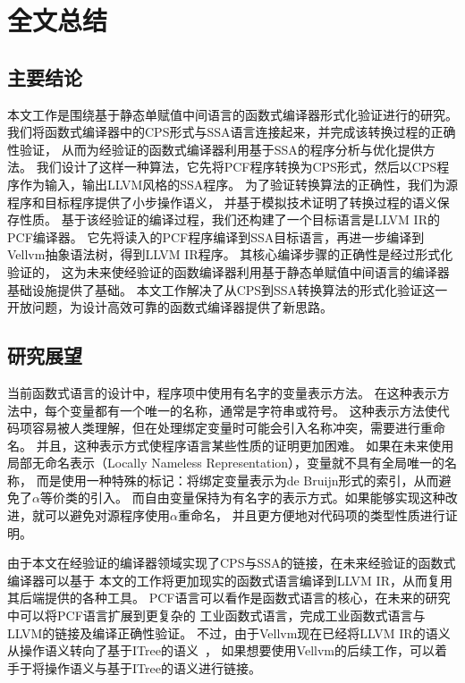 
\chapter{全文总结} \label{ch:summary}

\section{主要结论}

本文工作是围绕基于静态单赋值中间语言的函数式编译器形式化验证进行的研究。
我们将函数式编译器中的CPS形式与SSA语言连接起来，并完成该转换过程的正确性验证，
从而为经验证的函数式编译器利用基于SSA的程序分析与优化提供方法。
我们设计了这样一种算法，它先将PCF程序转换为CPS形式，然后以CPS程序作为输入，输出LLVM风格的SSA程序。
为了验证转换算法的正确性，我们为源程序和目标程序提供了小步操作语义，
并基于模拟技术证明了转换过程的语义保存性质。
基于该经验证的编译过程，我们还构建了一个目标语言是LLVM IR的PCF编译器。
它先将读入的PCF程序编译到SSA目标语言，再进一步编译到Vellvm抽象语法树，得到LLVM IR程序。
其核心编译步骤的正确性是经过形式化验证的，
这为未来使经验证的函数编译器利用基于静态单赋值中间语言的编译器基础设施提供了基础。
本文工作解决了从CPS到SSA转换算法的形式化验证这一开放问题，为设计高效可靠的函数式编译器提供了新思路。

\section{研究展望}

当前函数式语言的设计中，程序项中使用有名字的变量表示方法。
在这种表示方法中，每个变量都有一个唯一的名称，通常是字符串或符号。
这种表示方法使代码项容易被人类理解，但在处理绑定变量时可能会引入名称冲突，需要进行重命名。
并且，这种表示方式使程序语言某些性质的证明更加困难。
如果在未来使用局部无命名表示（Locally Nameless Representation），变量就不具有全局唯一的名称，
而是使用一种特殊的标记：将绑定变量表示为de Bruijn形式的索引，从而避免了$\alpha$等价类的引入。
而自由变量保持为有名字的表示方式。如果能够实现这种改进，就可以避免对源程序使用$\alpha$重命名，
并且更方便地对代码项的类型性质进行证明。

由于本文在经验证的编译器领域实现了CPS与SSA的链接，在未来经验证的函数式编译器可以基于
本文的工作将更加现实的函数式语言编译到LLVM IR，从而复用其后端提供的各种工具。
PCF语言可以看作是函数式语言的核心，在未来的研究中可以将PCF语言扩展到更复杂的
工业函数式语言，完成工业函数式语言与LLVM的链接及编译正确性验证。
不过，由于Vellvm现在已经将LLVM IR的语义从操作语义转向了基于ITree的语义~\cite{itree2019,itreevellvm2021}，
如果想要使用Vellvm的后续工作，可以着手于将操作语义与基于ITree的语义进行链接。
